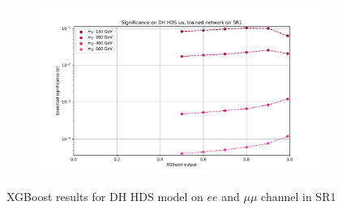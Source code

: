 \documentclass[12pt, a4paper]{book}
\begin{document}
\begin{figure}[!ht]
\begin{subfigure}[b]{0.49\textwidth}
   \end{subfigure}
   \hfill
   \begin{subfigure}[b]{0.49\textwidth}
      \centering
      \includegraphics[width=1\textwidth]{XGBoost/Model_independent/50-100/DH_HDS/EXP_SIG_uu.pdf}
   \end{subfigure}
   \caption{XGBoost results for DH HDS model on $ee$ and $\mu\mu$ channel in SR1}\label{fig:DH_HDS_SR1}
\end{figure}
\end{document}
